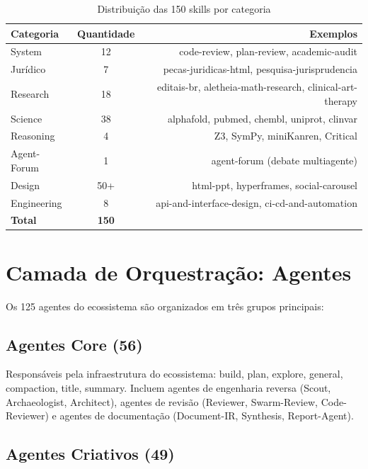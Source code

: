 \documentclass[12pt,a4paper,sumario=tradicional]{abntex2}
\begin{document}
\begin{table}[H]
\centering
\caption{Distribuição das 150 skills por categoria}
\label{tab:skills}
\begin{tabular}{@{}lcr@{}}
\toprule
\textbf{Categoria} & \textbf{Quantidade} & \textbf{Exemplos} \\
\midrule
System           & 12 & code-review, plan-review, academic-audit \\
Jurídico         & 7  & pecas-juridicas-html, pesquisa-jurisprudencia \\
Research         & 18 & editais-br, aletheia-math-research, clinical-art-therapy \\
Science          & 38 & alphafold, pubmed, chembl, uniprot, clinvar \\
Reasoning        & 4  & Z3, SymPy, miniKanren, Critical \\
Agent-Forum      & 1  & agent-forum (debate multiagente) \\
Design           & 50+ & html-ppt, hyperframes, social-carousel \\
Engineering      & 8  & api-and-interface-design, ci-cd-and-automation \\
\midrule
\textbf{Total}   & \textbf{150} & \\
\bottomrule
\end{tabular}
\end{table}

\section{Camada de Orquestração: Agentes}

Os 125 agentes do ecossistema são organizados em três grupos principais:

\subsection{Agentes Core (56)}

Responsáveis pela infraestrutura do ecossistema: build, plan, explore, general, compaction, title, summary. Incluem agentes de engenharia reversa (Scout, Archaeologist, Architect), agentes de revisão (Reviewer, Swarm-Review, Code-Reviewer) e agentes de documentação (Document-IR, Synthesis, Report-Agent).

\subsection{Agentes Criativos (49)}
\end{document}

